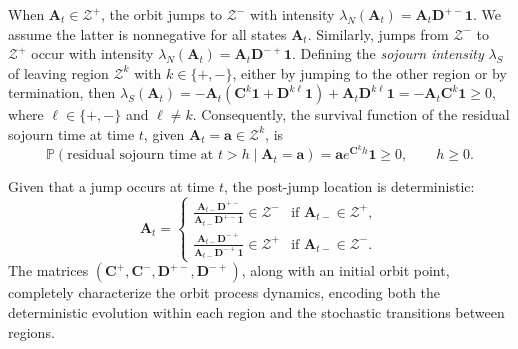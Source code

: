 \documentclass[a4paper,11pt]{article}
\numberwithin{equation}{section}
\theoremstyle{plain}
\theoremstyle{definition}
\newcommand{\1}{\mathbf{1}}
\begin{document}
When $\bm{A}_t \in \mathcal{Z}^+$, the orbit jumps to $\mathcal{Z}^-$ with intensity $\lambda_N(\bm{A}_t) = \bm{A}_t \bm{D}^{+-} \bm{1}$.
We assume the latter is nonnegative for all states $\bm{A}_t$. 
Similarly, jumps from $\mathcal{Z}^-$ to $\mathcal{Z}^+$ occur with intensity $\lambda_N(\bm{A}_t) = \bm{A}_t \bm{D}^{-+} \bm{1}$. 
Defining the \emph{sojourn intensity} $\lambda_S$ of leaving region $\mathcal{Z}^k$ with $k\in\{+,-\}$, either by jumping to the other region or by termination, then $\lambda_S(\bm{A}_t) =-\bm{A}_t(\bm{C}^k \bm{1} + \bm{D}^{k\ell} \bm{1})+ \bm{A}_t\bm{D}^{k\ell} \bm{1}= -\bm{A}_t \bm{C}^k \bm{1}\ge 0$, where $\ell\in\{+,- \}$ and $\ell\neq k$.
Consequently, the survival function of the residual sojourn time at time $t$, given $\bm{A}_t = \bm{a} \in \mathcal{Z}^k$, is
\begin{equation}
\mathbb{P}(\text{residual sojourn time at } t > h \mid \bm{A}_t = \bm{a}) = \bm{a} e^{\bm{C}^k h} \bm{1} \ge 0, \qquad h \ge 0.\label{eq:survival-residual-simple}
\end{equation}

Given that a jump occurs at time $t$, the post-jump location is deterministic:
\begin{equation}\label{eq:jump_two_space}
\bm{A}_t = \begin{cases}
\frac{\bm{A}_{t-} \bm{D}^{+-}}{\bm{A}_{t-} \bm{D}^{+-} \bm{1}} \in \mathcal{Z}^- & \text{if } \bm{A}_{t-} \in \mathcal{Z}^+, \\
\frac{\bm{A}_{t-} \bm{D}^{-+}}{\bm{A}_{t-} \bm{D}^{-+} \bm{1}} \in \mathcal{Z}^+ & \text{if } \bm{A}_{t-} \in \mathcal{Z}^-.
\end{cases}
\end{equation}
The matrices $(\bm{C}^+, \bm{C}^-, \bm{D}^{+-}, \bm{D}^{-+})$, along with an initial orbit point, completely characterize the orbit process dynamics, encoding both the deterministic evolution within each region and the stochastic transitions between regions.
\end{document}
